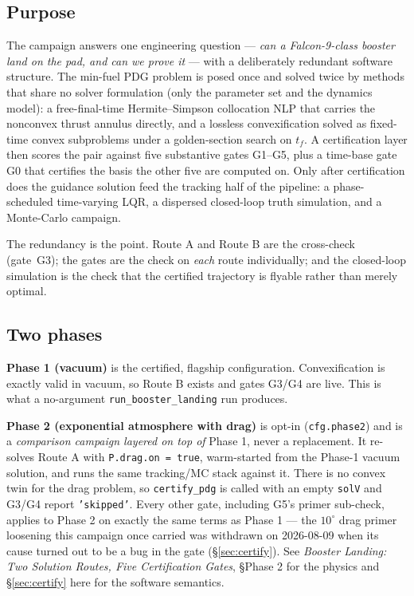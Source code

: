 \documentclass[11pt]{article}
\newcommand{\thenote}{\emph{Booster Landing: Two Solution Routes, Five
Certification Gates}}
\newcommand{\noteS}[1]{\thenote, \S#1}
\newcommand{\file}[1]{\texttt{#1}}
\begin{document}
\subsection{Purpose}

The campaign answers one engineering question --- \emph{can a Falcon-9-class
booster land on the pad, and can we prove it} --- with a deliberately
redundant software structure. The min-fuel PDG problem is posed once and
solved twice by methods that share no solver formulation (only the
parameter set and the dynamics model): a free-final-time Hermite--Simpson
collocation NLP that carries the nonconvex thrust annulus directly, and a
lossless convexification solved as fixed-time convex subproblems under a
golden-section search on $t_f$. A certification layer then scores the pair
against five substantive gates G1--G5, plus a time-base gate G0 that
certifies the basis the other five are computed on. Only after certification does the guidance solution feed
the tracking half of the pipeline: a phase-scheduled time-varying LQR, a
dispersed closed-loop truth simulation, and a Monte-Carlo campaign.

The redundancy is the point. Route A and Route B are the cross-check
(gate~G3); the gates are the check on \emph{each} route individually; and
the closed-loop simulation is the check that the certified trajectory is
flyable rather than merely optimal.

\subsection{Two phases}

\textbf{Phase 1 (vacuum)} is the certified, flagship configuration.
Convexification is exactly valid in vacuum, so Route B exists and gates
G3/G4 are live. This is what a no-argument \file{run\_booster\_landing} run
produces.

\textbf{Phase 2 (exponential atmosphere with drag)} is opt-in
(\texttt{cfg.phase2}) and is a \emph{comparison campaign layered on top of}
Phase 1, never a replacement. It re-solves Route A with
\texttt{P.drag.on = true}, warm-started from the Phase-1 vacuum solution,
and runs the same tracking/MC stack against it. There is no convex twin for
the drag problem, so \texttt{certify\_pdg} is called with an empty
\texttt{solV} and G3/G4 report \texttt{'skipped'}. Every other gate,
including G5's primer sub-check, applies to Phase 2 on exactly the same
terms as Phase 1 --- the $10^\circ$ drag primer loosening this campaign
once carried was withdrawn on 2026-08-09 when its cause turned out to be a
bug in the gate (\S\ref{sec:certify}). See
\noteS{Phase 2} for the physics and \S\ref{sec:certify} here for the
software semantics.
\end{document}
